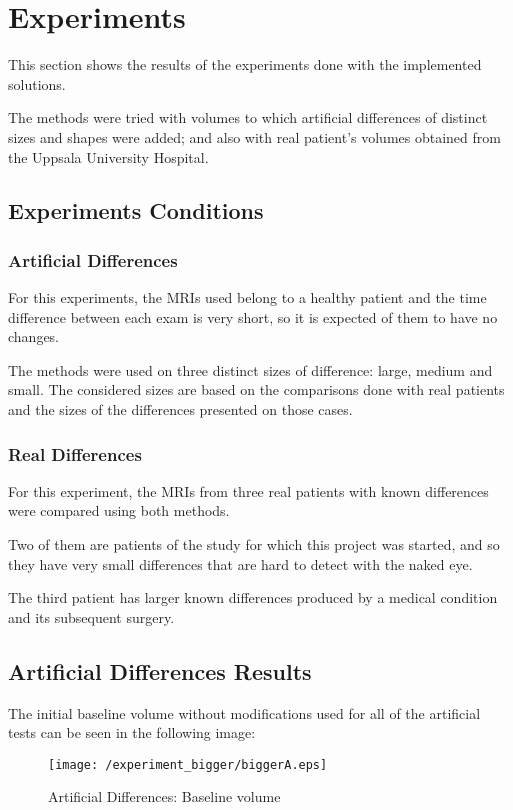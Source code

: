 \chapter{Experiments}
This section shows the results of the experiments done with the
implemented solutions. 

The methods were tried with volumes to which artificial differences of
distinct sizes and shapes were added; and also with real patient's
volumes obtained from the Uppsala University Hospital.


\section{Experiments Conditions}

\subsection{Artificial Differences}
For this experiments, the MRIs used belong to a healthy patient and
the time difference between each exam is very short, so it is expected
of them to have no changes.

The methods were used on three distinct sizes of difference: large,
medium and small. The considered sizes are based on the comparisons
done with real patients and the sizes of the differences presented on
those cases.


\subsection{Real Differences}
For this experiment, the MRIs from three real patients with known
differences were compared using both methods.

Two of them are patients of the study for which this project was
started, and so they have very small differences that are hard to
detect with the naked eye.

The third patient has larger known differences produced by a medical
condition and its subsequent surgery.


\section{Artificial Differences Results}
The initial baseline volume without modifications used for all of the
artificial tests can be seen in the following image:

\begin{figure}[H]
  \centering
  \texttt{[image: /experiment\_bigger/biggerA.eps]}
  \caption{Artificial Differences: Baseline volume}
  \label{artificial_base}
\end{figure}

